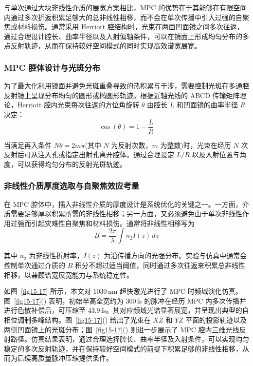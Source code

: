 与单次通过大块非线性介质的展宽方案相比，MPC 的优势在于其能够在有限空间内通过多次折返积累足够大的总非线性相移，而不会在单次传播中引入过强的自聚焦或材料损伤。通常采用 Herriott 腔结构时，光束在两面凹面镜之间多次往返，通过合理设计腔长、曲率半径以及入射偏轴条件，可以在镜面上形成均匀分布的多点反射轨迹，从而在保持较好空间模式的同时实现高效谱宽展宽。





\subsubsection{MPC 腔体设计与光斑分布}

为了最大化利用镜面并避免光斑重叠导致的热积累与干涉，需要控制光斑在多通腔反射镜上呈现分布均匀的圆形或椭圆形轨迹。根据近轴光线的 ABCD 传输矩阵理论，Herriott 腔内光束每次往返的方位角旋转 $\theta$ 由腔长 $L$ 和凹面镜的曲率半径 $R$ 决定：
\begin{equation}
    \cos(\theta) = 1 - \frac{L}{R}
\end{equation}

当满足再入条件 $N\theta = 2m\pi$(其中 $N$ 为反射次数，$m$ 为整数)时，光束在经历 $N$ 次反射后可从注入孔或指定出射孔离开腔体。通过合理设定 $L/R$ 以及入射位置与角度，可以获得均匀分布的反射光斑轨迹。


\subsubsection{非线性介质厚度选取与自聚焦效应考量}

在 MPC 腔体中，插入非线性介质的厚度设计是系统优化的关键之一。一方面，介质需要足够厚以积累所需的非线性相移；另一方面，又必须避免由于单次非线性作用过强而引起灾难性自聚焦和材料损伤。通常将非线性相移写为
\begin{equation}
    B = \frac{2\pi}{\lambda}\int n_2 I(z)\,dz
\end{equation}

其中 $n_2$ 为非线性折射率，$I(z)$ 为沿传播方向的光强分布。实验与仿真中通常会控制单次通过介质的 $B$ 积分不超过适当阈值，同时通过多次往返来积累总非线性相移，以兼顾谱宽展宽能力与系统稳定性。

如图~\ref{fig15-17} 所示，本文对 1030\,nm 超快激光进行了 MPC 时频域演化仿真。图~\ref{fig15-17}() 表明，初始半高全宽约为 300\,fs 的脉冲在经历 MPC 内多次传播并进行色散补偿后，可压缩至 43.9\,fs。其对应频域光谱显著展宽，并呈现出典型的自相位调制多峰结构。图~\ref{fig15-17}() 给出了光束在 $XZ$ 和 $YZ$ 平面的投影轨迹以及两侧凹面镜上的光斑分布；图~\ref{fig15-17}() 则进一步展示了 MPC 腔内三维光线反射路径。仿真结果表明，通过合理选择腔长、曲率半径及入射条件，可以实现均匀稳定的多次反射轨迹，并在保持较好空间模式的前提下积累足够的非线性相移，从而为后续高质量脉冲压缩提供条件。

